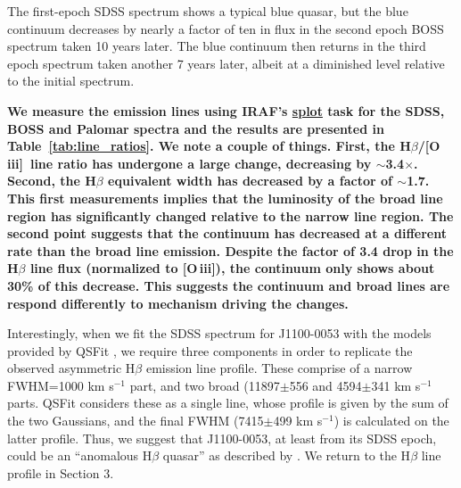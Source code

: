 \documentclass[a4paper,fleqn,usenatbib]{mnras}
\begin{document}
The first-epoch
SDSS spectrum shows a typical blue quasar, but the blue continuum
decreases by nearly a factor of ten in flux in the second epoch BOSS
spectrum taken 10 years later. The blue continuum then returns in the
third epoch spectrum taken another 7 years later, albeit at a
diminished level relative to the initial spectrum. 

{\bf
We measure the emission lines using IRAF's
\href{http://stsdas.stsci.edu/cgi-bin/gethelp.cgi?splot.hlp}{splot}
task for the SDSS, BOSS and Palomar spectra and the results are
presented in Table~\ref{tab:line_ratios}.  We note a couple of things.
First, the H$\beta$/[O\,{\sc iii}]\ line ratio has undergone a large
change, decreasing by $\sim$3.4$\times$.  Second, the H$\beta$
equivalent width has decreased by a factor of $\sim$1.7.
This first measurements implies that the luminosity of the broad line
region has significantly changed relative to the narrow line region.
The second point suggests that the continuum has decreased at a
different rate than the broad line emission. Despite the factor of 3.4 
drop in the H$\beta$ line flux (normalized to [O\,{\sc iii}]), the
continuum only shows about 30\% of this decrease.  This suggests the
continuum and broad lines are respond differently to mechanism driving
the changes. 

Interestingly, when we fit the SDSS spectrum for J1100-0053 with the
models provided by QSFit \citep[see][and
\href{http://qsfit.inaf.it/}{http://qsfit.inaf.it/} ]{Calderone2017},
we require three components in order to replicate the observed
asymmetric H$\beta$ emission line profile.  These comprise of a narrow
FWHM=1000 km s$^{-1}$ part, and two broad (11897$\pm$556 and
4594$\pm$341 km s$^{-1}$ parts.  QSFit considers these as a single
line, whose profile is given by the sum of the two Gaussians, and the
final FWHM (7415$\pm$499 km s$^{-1}$) is calculated on the latter
profile.  Thus, we suggest that J1100-0053, at least from its SDSS
epoch, could be an ``anomalous H$\beta$ quasar'' as described by
\citet{Steinhardt_Silverman2013}.  We return to the H$\beta$ line
profile in Section 3.
}
\end{document}

